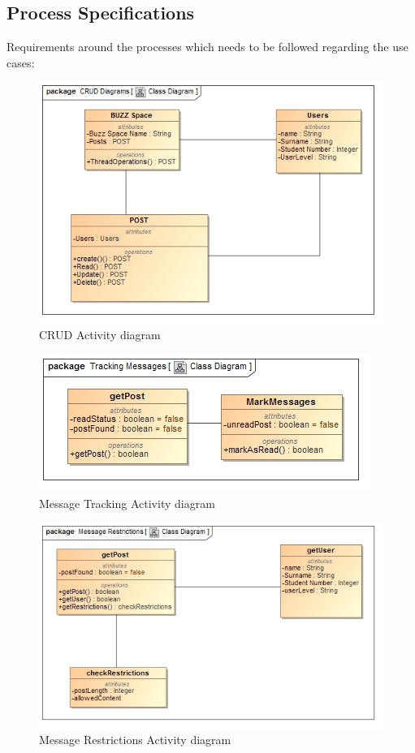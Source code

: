 \documentclass[11pt]{article}
\begin{document}
\subsection{Process Specifications}
Requirements around the processes which needs to be followed regarding the use cases: \newline

\graphicspath{ {../Diagrams/Kyhle/Activity_Diagrams/} }
	\begin{figure}[H]	
    	\includegraphics[scale=0.5]{CRUD.jpg}
    	\caption{CRUD Activity diagram}
	\end{figure}
    	
	\begin{figure}[H]	
    	\includegraphics[scale=0.5]{messageTracking.jpg}
    	\caption{Message Tracking Activity diagram}
	\end{figure}
	
	\begin{figure}[H]	
    	\includegraphics[scale=0.5]{messageRestrictions.jpg}
    	\caption{Message Restrictions Activity diagram}
	\end{figure}
\end{document}
